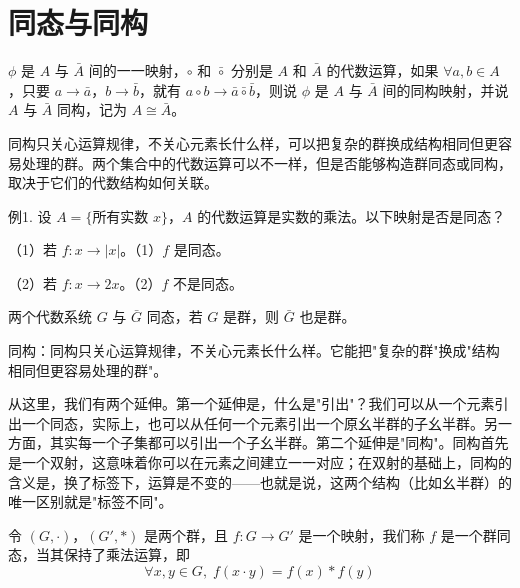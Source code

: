 \section{同态与同构}

\begin{definition}[同态与同构]
$\phi$ 是 $A$ 与 $\bar{A}$ 间的一一映射，$\circ$ 和 $\bar{\circ}$ 分别是 $A$ 和 $\bar{A}$ 的代数运算，如果 $\forall a,b\in A$，只要 $a\to\bar{a}$，$b\to\bar{b}$，就有 $a\circ b\to\bar{a}\bar{\circ}\bar{b}$，则说 $\phi$ 是 $A$ 与 $\bar{A}$ 间的同构映射，并说 $A$ 与 $\bar{A}$ 同构，记为 $A\cong\bar{A}$。

同构只关心运算规律，不关心元素长什么样，可以把复杂的群换成结构相同但更容易处理的群。两个集合中的代数运算可以不一样，但是否能够构造群同态或同构，取决于它们的代数结构如何关联。
\end{definition}

\begin{example}[同态例子]
例1. 设 $A=\{\text{所有实数 }x\}$，$A$ 的代数运算是实数的乘法。以下映射是否是同态？

（1）若 $f:x\to|x|$。（1）$f$ 是同态。

（2）若 $f:x\to2x$。（2）$f$ 不是同态。
\end{example}

\begin{theorem}[同态定理]
两个代数系统 $G$ 与 $\bar{G}$ 同态，若 $G$ 是群，则 $\bar{G}$ 也是群。
\end{theorem}

\begin{note}[同态的意义]
同构：同构只关心运算规律，不关心元素长什么样。它能把"复杂的群"换成"结构相同但更容易处理的群"。
\end{note}

\begin{note}[同态同构的意义]
从这里，我们有两个延伸。第一个延伸是，什么是"引出"？我们可以从一个元素引出一个同态，实际上，也可以从任何一个元素引出一个原幺半群的子幺半群。另一方面，其实每一个子集都可以引出一个子幺半群。第二个延伸是"同构"。同构首先是一个双射，这意味着你可以在元素之间建立一一对应；在双射的基础上，同构的含义是，换了标签下，运算是不变的——也就是说，这两个结构（比如幺半群）的唯一区别就是"标签不同"。
\end{note}

\begin{definition}[群同态（定义 1.14）]
令 $(G,\cdot)$，$(G',*)$ 是两个群，且 $f:G\to G'$ 是一个映射，我们称 $f$ 是一个群同态，当其保持了乘法运算，即
\[
\forall x,y\in G,\;f(x\cdot y)=f(x)*f(y)
\]
\end{definition}

